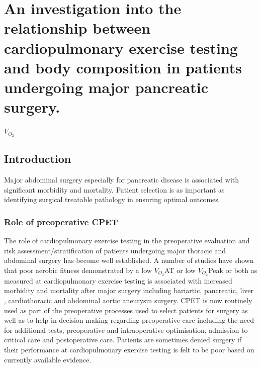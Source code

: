 
\chapter{An investigation into the relationship between cardiopulmonary exercise testing and body composition in patients undergoing major pancreatic surgery.}
\label{ch_bodycomp}


\clearpage
$\dot{V}_{O_2}$
\section{Introduction}
Major abdominal surgery especially for pancreatic disease is associated with significant morbidity and mortality. Patient selection is as important as identifying surgical treatable pathology in ensuring optimal outcomes. \parencite{balthazar_acute_2002}

\subsection{Role of preoperative CPET}
The role of cardiopulmonary exercise testing in the preoperative evaluation and risk assessment/stratification of patients undergoing major thoracic and abdominal surgery has become well established. A number of studies have shown that poor aerobic fitness demonstrated by a low $\dot{V}_{O_2}$AT or low $\dot{V}_{O_2}$Peak or both as measured at cardiopulmonary exercise testing is associated with increased morbidity and mortality after major surgery including bariartic\parencite{mccullough_cardiorespiratory_2006}, pancreatic\parencite{chandrabalan_pre-operative_2013,ausania_effects_2012}, liver \parencite{epstein_aerobic_2004}, cardiothoracic\parencite{brunelli_risk_2010, campione_oxygen_2010,torchio_exercise_2010} and abdominal aortic aneurysm surgery.\parencite{carlisle_mid-term_2007,thompson_cardiopulmonary_2011} CPET is now routinely used as part of the preoperative processes used to select patients for surgery as well as to help in decision making regarding preoperative care including the need for additional tests, preoperative and intraoperative optimisation, admission to critical care and postoperative care.
Patients are sometimes denied surgery if their performance at cardiopulmonary exercise testing is felt to be poor based on currently available evidence.


